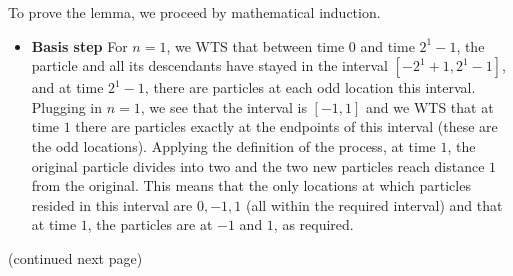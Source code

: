 \begin{description}
{  To prove the lemma, we proceed by mathematical induction.

  \begin{itemize}
    \item {\bf Basis step} For $n=1$, we WTS that between time $0$ and
      time $2^1-1$, the particle and all its descendants have stayed in the interval
      $[-2^1+1, 2^1-1]$, and at time $2^1-1$, there are particles at each odd location
      this interval.  Plugging in $n=1$, we see that the interval is $[-1,1]$ and we WTS that 
      at time $1$ there are particles exactly at the endpoints of this interval (these are 
      the odd locations).  Applying the definition of the process, at time $1$, the original 
      particle divides into two and the two new particles reach distance $1$ from the original.
      This means that the only locations at which particles resided in this interval are
      $0,-1,1$ (all within the required interval) and that at time $1$, the particles
      are at $-1$ and $1$, as required.
  \end{itemize}  
  (continued next page)
  }
\fi
{}
\end{description}
